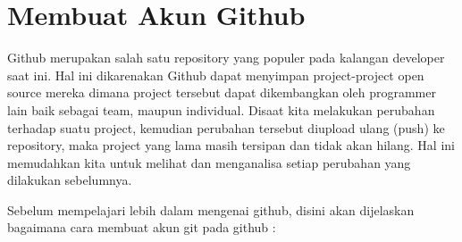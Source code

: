 \section{Membuat Akun Github}
Github merupakan salah satu repository yang populer pada kalangan developer saat ini. Hal ini dikarenakan Github dapat menyimpan project-project open source mereka dimana project tersebut dapat dikembangkan oleh programmer lain baik sebagai team, maupun individual. Disaat kita melakukan perubahan terhadap suatu project, kemudian perubahan tersebut diupload ulang (push) ke repository, maka project yang lama masih tersipan dan tidak akan hilang. Hal ini memudahkan kita untuk melihat dan menganalisa setiap perubahan yang dilakukan sebelumnya. 

Sebelum mempelajari lebih dalam mengenai github, disini akan dijelaskan bagaimana cara membuat akun git pada github :
